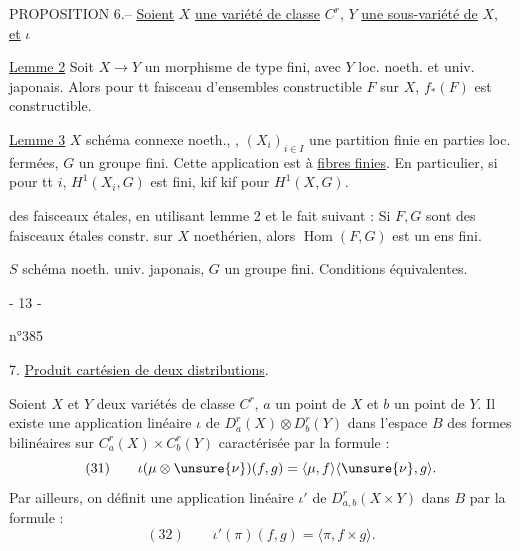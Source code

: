 PROPOSITION 6.-- \uline{Soient} $X$ \uline{une variété de classe} $C^r$, $Y$ \uline{une sous-variété de} $X$, \uline{et} $\iota$

\uline{Lemme 2} Soit $X\to Y$ un morphisme de type fini, avec $Y$ loc. noeth. et univ. japonais.
Alors pour tt faisceau d'ensembles constructible $F$ sur $X$, $f_*(F)$ est constructible.


\uline{Lemme 3} $X$ schéma connexe  noeth.,
,
$(X_i)_{i\in I}$ une partition finie en parties loc. fermées, $G$ un groupe fini.
Cette application est à \uline{fibres finies}. En particulier, si pour tt $i$, $H^1(X_i,G)$ est fini, kif kif pour $H^1(X,G)$.

 des faisceaux étales, en utilisant lemme 2 et le fait suivant :
Si $F,G$ sont des faisceaux  étales constr. sur $X$ noethérien, alors $\operatorname{Hom}(F,G)$ est un ens fini.

$S$  schéma noeth. univ. japonais,
$G$ un groupe fini. Conditions équivalentes.

\begin{center}- 13 -\end{center}
\begin{flushright}n°385\end{flushright}
7. \uline{Produit cartésien de deux distributions}.

Soient $X$ et $Y$ deux variétés de classe $C^r$, $a$ un point de $X$ et $b$ un point de $Y$.
Il existe une application linéaire $\iota$ de $D_a^r(X)\otimes D_b^r(Y)$ dans l'espace $B$ des formes bilinéaires sur $C_a^r(X)\times C_b^r(Y)$ caractérisée par la formule :
\[
(31)\qquad \iota(\mu\otimes\unsure{\nu})(f,g)=\langle\mu,f\rangle\langle\unsure{\nu},g\rangle.
\]
Par ailleurs, on définit une application linéaire $\iota'$ de $D_{a,b}^r(X\times Y)$ dans $B$ par la formule :
\[
(32)\qquad \iota'(\pi)(f,g)=\langle\pi,f\times g\rangle.
\]

